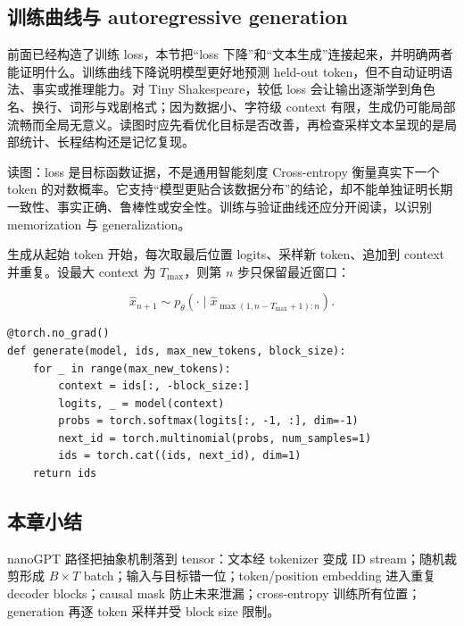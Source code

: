 \subsection{训练曲线与 autoregressive generation}

前面已经构造了训练 loss，本节把“loss 下降”和“文本生成”连接起来，并明确两者能证明什么。训练曲线下降说明模型更好地预测 held-out token，但不自动证明语法、事实或推理能力。对 Tiny Shakespeare，较低 loss 会让输出逐渐学到角色名、换行、词形与戏剧格式；因为数据小、字符级 context 有限，生成仍可能局部流畅而全局无意义。读图时应先看优化目标是否改善，再检查采样文本呈现的是局部统计、长程结构还是记忆复现。


\begin{warningbox}{读图：loss 是目标函数证据，不是通用智能刻度}
Cross-entropy 衡量真实下一个 token 的对数概率。它支持“模型更贴合该数据分布”的结论，却不能单独证明长期一致性、事实正确、鲁棒性或安全性。训练与验证曲线还应分开阅读，以识别 memorization 与 generalization。
\end{warningbox}


生成从起始 token 开始，每次取最后位置 logits、采样新 token、追加到 context 并重复。设最大 context 为 $T_{\max}$，则第 $n$ 步只保留最近窗口：

\[
\hat x_{n+1}\sim p_\theta(\cdot\mid \hat x_{\max(1,n-T_{\max}+1):n}).
\]

\begin{lstlisting}[caption={带有限 context cropping 的 autoregressive generation。}]
@torch.no_grad()
def generate(model, ids, max_new_tokens, block_size):
    for _ in range(max_new_tokens):
        context = ids[:, -block_size:]
        logits, _ = model(context)
        probs = torch.softmax(logits[:, -1, :], dim=-1)
        next_id = torch.multinomial(probs, num_samples=1)
        ids = torch.cat((ids, next_id), dim=1)
    return ids
\end{lstlisting}


\subsection{本章小结}

nanoGPT 路径把抽象机制落到 tensor：文本经 tokenizer 变成 ID stream；随机裁剪形成 $B\times T$ batch；输入与目标错一位；token/position embedding 进入重复 decoder blocks；causal mask 防止未来泄漏；cross-entropy 训练所有位置；generation 再逐 token 采样并受 block size 限制。

